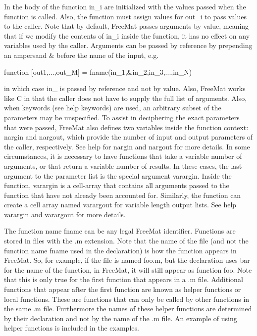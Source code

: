 In the body of the function {\ttfamily in\-\_\-i} are initialized with the values passed when the function is called. Also, the function must assign values for {\ttfamily out\-\_\-i} to pass values to the caller. Note that by default, Free\-Mat passes arguments by value, meaning that if we modify the contents of {\ttfamily in\-\_\-i} inside the function, it has no effect on any variables used by the caller. Arguments can be passed by reference by prepending an ampersand {\ttfamily \&} before the name of the input, e.\-g. \begin{DoxyVerb}  function [out1,...,out_M] = fname(in_1,&in_2,in_3,...,in_N)
\end{DoxyVerb}
 in which case {\ttfamily in\-\_} is passed by reference and not by value. Also, Free\-Mat works like {\ttfamily C} in that the caller does not have to supply the full list of arguments. Also, when {\ttfamily keywords} (see help {\ttfamily keywords}) are used, an arbitrary subset of the parameters may be unspecified. To assist in deciphering the exact parameters that were passed, Free\-Mat also defines two variables inside the function context\-: {\ttfamily nargin} and {\ttfamily nargout}, which provide the number of input and output parameters of the caller, respectively. See help for {\ttfamily nargin} and {\ttfamily nargout} for more details. In some circumstances, it is necessary to have functions that take a variable number of arguments, or that return a variable number of results. In these cases, the last argument to the parameter list is the special argument {\ttfamily varargin}. Inside the function, {\ttfamily varargin} is a cell-\/array that contains all arguments passed to the function that have not already been accounted for. Similarly, the function can create a cell array named {\ttfamily varargout} for variable length output lists. See help {\ttfamily varargin} and {\ttfamily varargout} for more details.

The function name {\ttfamily fname} can be any legal Free\-Mat identifier. Functions are stored in files with the {\ttfamily .m} extension. Note that the name of the file (and not the function name {\ttfamily fname} used in the declaration) is how the function appears in Free\-Mat. So, for example, if the file is named {\ttfamily foo.\-m}, but the declaration uses {\ttfamily bar} for the name of the function, in Free\-Mat, it will still appear as function {\ttfamily foo}. Note that this is only true for the first function that appears in a {\ttfamily .m} file. Additional functions that appear after the first function are known as {\ttfamily helper functions} or {\ttfamily local} functions. These are functions that can only be called by other functions in the same {\ttfamily .m} file. Furthermore the names of these helper functions are determined by their declaration and not by the name of the {\ttfamily .m} file. An example of using helper functions is included in the examples.

